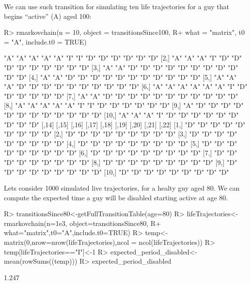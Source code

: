 \documentclass[
  nojss]{jss}
\begin{document}
We can use such transition for simulating ten life trajectories for a guy that begins ``active'' (A) aged 100:

\begin{CodeChunk}

\begin{CodeInput}
R> rmarkovchain(n = 10, object = transitionsSince100,
R+              what = "matrix", t0 = "A", include.t0 = TRUE)
\end{CodeInput}

\begin{CodeOutput}
      [,1] [,2] [,3] [,4] [,5] [,6] [,7] [,8] [,9] [,10] [,11] [,12] [,13]
 [1,] "A"  "A"  "A"  "A"  "A"  "I"  "I"  "D"  "D"  "D"   "D"   "D"   "D"  
 [2,] "A"  "A"  "A"  "I"  "D"  "D"  "D"  "D"  "D"  "D"   "D"   "D"   "D"  
 [3,] "A"  "A"  "D"  "D"  "D"  "D"  "D"  "D"  "D"  "D"   "D"   "D"   "D"  
 [4,] "A"  "A"  "D"  "D"  "D"  "D"  "D"  "D"  "D"  "D"   "D"   "D"   "D"  
 [5,] "A"  "A"  "A"  "D"  "D"  "D"  "D"  "D"  "D"  "D"   "D"   "D"   "D"  
 [6,] "A"  "A"  "A"  "A"  "A"  "A"  "I"  "D"  "D"  "D"   "D"   "D"   "D"  
 [7,] "A"  "A"  "D"  "D"  "D"  "D"  "D"  "D"  "D"  "D"   "D"   "D"   "D"  
 [8,] "A"  "A"  "A"  "A"  "A"  "I"  "I"  "D"  "D"  "D"   "D"   "D"   "D"  
 [9,] "A"  "D"  "D"  "D"  "D"  "D"  "D"  "D"  "D"  "D"   "D"   "D"   "D"  
[10,] "A"  "A"  "A"  "I"  "D"  "D"  "D"  "D"  "D"  "D"   "D"   "D"   "D"  
      [,14] [,15] [,16] [,17] [,18] [,19] [,20] [,21] [,22]
 [1,] "D"   "D"   "D"   "D"   "D"   "D"   "D"   "D"   "D"  
 [2,] "D"   "D"   "D"   "D"   "D"   "D"   "D"   "D"   "D"  
 [3,] "D"   "D"   "D"   "D"   "D"   "D"   "D"   "D"   "D"  
 [4,] "D"   "D"   "D"   "D"   "D"   "D"   "D"   "D"   "D"  
 [5,] "D"   "D"   "D"   "D"   "D"   "D"   "D"   "D"   "D"  
 [6,] "D"   "D"   "D"   "D"   "D"   "D"   "D"   "D"   "D"  
 [7,] "D"   "D"   "D"   "D"   "D"   "D"   "D"   "D"   "D"  
 [8,] "D"   "D"   "D"   "D"   "D"   "D"   "D"   "D"   "D"  
 [9,] "D"   "D"   "D"   "D"   "D"   "D"   "D"   "D"   "D"  
[10,] "D"   "D"   "D"   "D"   "D"   "D"   "D"   "D"   "D"  
\end{CodeOutput}
\end{CodeChunk}

Lets consider 1000 simulated live trajectories, for a healty guy aged 80. We can compute the expected time a guy will be disabled starting active at age 80.

\begin{CodeChunk}

\begin{CodeInput}
R> transitionsSince80<-getFullTransitionTable(age=80)
R> lifeTrajectories<-rmarkovchain(n=1e3, object=transitionsSince80,
R+                                what="matrix",t0="A",include.t0=TRUE)
R> temp<-matrix(0,nrow=nrow(lifeTrajectories),ncol = ncol(lifeTrajectories))
R> temp[lifeTrajectories=="I"]<-1
R> expected_period_disabled<-mean(rowSums((temp)))
R> expected_period_disabled
\end{CodeInput}

\begin{CodeOutput}
[1] 1.247
\end{CodeOutput}
\end{CodeChunk}
\end{document}
